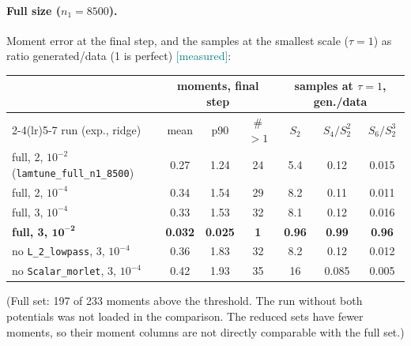 \documentclass[11pt,a4paper]{article}
\newcommand{\code}[1]{\texttt{#1}}
\newcommand{\meas}{\textcolor{teal}{\textsf{[measured]}}}
\begin{document}
\paragraph{Full size ($n_1=8500$).} Moment error at the final step, and the samples at the
smallest scale ($\tau=1$) as ratio generated/data (1 is perfect) \meas:
\begin{center}\small
\begin{tabular}{@{}lcccccc@{}}
\toprule
 & \multicolumn{3}{c}{moments, final step} & \multicolumn{3}{c}{samples at $\tau=1$, gen./data}\\
\cmidrule(lr){2-4}\cmidrule(lr){5-7}
run (exp., ridge) & mean & p90 & \# $>1$ & $S_2$ & $S_4/S_2^2$ & $S_6/S_2^3$\\
\midrule
full, 2, $10^{-2}$ (\code{lamtune\_full\_n1\_8500}) & 0.27 & 1.24 & 24 & 5.4 & 0.12 & 0.015\\
full, 2, $10^{-4}$ & 0.34 & 1.54 & 29 & 8.2 & 0.11 & 0.011\\
full, 3, $10^{-4}$ & 0.33 & 1.53 & 32 & 8.1 & 0.12 & 0.016\\
\textbf{full, 3, $\mathbf{10^{-2}}$} & \textbf{0.032} & \textbf{0.025} & \textbf{1} & \textbf{0.96} & \textbf{0.99} & \textbf{0.96}\\
no \code{L\_2\_lowpass}, 3, $10^{-4}$ & 0.36 & 1.83 & 32 & 8.2 & 0.12 & 0.012\\
no \code{Scalar\_morlet}, 3, $10^{-4}$ & 0.42 & 1.93 & 35 & 16 & 0.085 & 0.005\\
\bottomrule
\end{tabular}
\end{center}
(Full set: 197 of 233 moments above the threshold. The run without both potentials was not
loaded in the comparison. The reduced sets have fewer moments, so their moment columns are not
directly comparable with the full set.)
\end{document}
